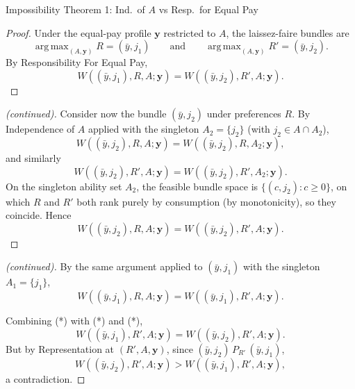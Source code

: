 \documentclass[10pt]{beamer}
\DeclareMathOperator*{\argmax}{arg\,max}
\begin{document}
\begin{frame}[allowframebreaks]{Impossibility Theorem 1: Ind.\ of $A$ vs Resp.\ for Equal Pay}
\begin{proof}
Under the equal-pay profile $\mathbf y$ restricted to $A$, the laissez-faire
bundles are
\begin{equation*}
\argmax_{(A,\mathbf y)}R=(\bar y,j_1)
\qquad\text{and}\qquad
\argmax_{(A,\mathbf y)}R'=(\bar y,j_2).
\end{equation*}
By Responsibility For Equal Pay,
\begin{equation*}
W((\bar y,j_1),R,A;\mathbf y)=W((\bar y,j_2),R',A;\mathbf y).\end{equation*}
\end{proof}
\framebreak
\begin{proof}[(continued)]
Consider now the bundle $(\bar y,j_2)$ under preferences $R$. By Independence of
$A$ applied with the singleton $A_2=\{j_2\}$ (with $j_2\in A\cap A_2$),
\begin{equation*}
W((\bar y,j_2),R,A;\mathbf y)=W((\bar y,j_2),R,A_2;\mathbf y),
\end{equation*}
and similarly
\begin{equation*}
W((\bar y,j_2),R',A;\mathbf y)=W((\bar y,j_2),R',A_2;\mathbf y).
\end{equation*}
On the singleton ability set $A_2$, the feasible bundle space is
$\{(c,j_2):c\geq 0\}$, on which $R$ and $R'$ both rank purely by consumption (by
monotonicity), so they coincide. Hence
\begin{equation*}
W((\bar y,j_2),R,A;\mathbf y)=W((\bar y,j_2),R',A;\mathbf y).\end{equation*}
\end{proof}
\framebreak
\begin{proof}[(continued)]
By the same argument applied to $(\bar y,j_1)$ with the singleton
$A_1=\{j_1\}$,
\begin{equation*}
W((\bar y,j_1),R,A;\mathbf y)=W((\bar y,j_1),R',A;\mathbf y).
\end{equation*}

Combining (*) with (*) and
(*),
\begin{equation*}
W((\bar y,j_1),R',A;\mathbf y)=W((\bar y,j_2),R',A;\mathbf y).
\end{equation*}
But by Representation at $(R',A,\mathbf y)$, since $(\bar y,j_2)\,P_{R'}\,(\bar
y,j_1)$,
\begin{equation*}
W((\bar y,j_2),R',A;\mathbf y)>W((\bar y,j_1),R',A;\mathbf y),
\end{equation*}
a contradiction.
\end{proof}

\medskip
\hyperlink{tab:classification}{}
\end{frame}
\end{document}
